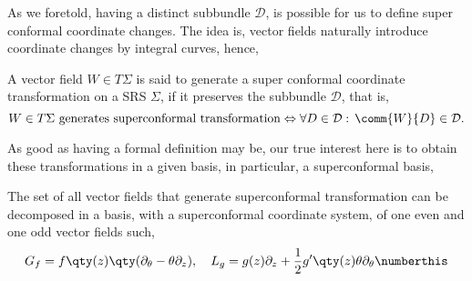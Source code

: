 As we foretold, having a distinct subbundle $\mathcal D$, is possible for us to define super conformal 
coordinate changes. The idea is, vector fields naturally introduce coordinate changes by integral curves, 
hence,
\begin{definition}
    A vector field $W\in T\Sigma$ is said to generate a super conformal coordinate transformation on a 
    SRS $\Sigma$, if it preserves the subbundle $\mathcal D$, that is, 
    $$W\in T\Sigma \textnormal{ generates superconformal transformation}\Leftrightarrow\forall D\in\mathcal D:\, \comm{W}{D}\in\mathcal D.$$
\end{definition}
As good as having a formal definition may be, our true interest here is to obtain these transformations in a given basis, 
in particular, a superconformal basis,
\begin{lemma}
    The set of all vector fields that generate superconformal transformation can be decomposed in a basis, 
    with a superconformal coordinate system, of one even and one odd vector fields such, 
    \[G_f=f\qty(z)\qty(\partial_\theta-\theta\partial_z),\ \ \ L_g=g(z)\partial_z+\frac12 g'\qty(z)\theta\partial_\theta\numberthis\label{nsgenerators}\]
\end{lemma}
